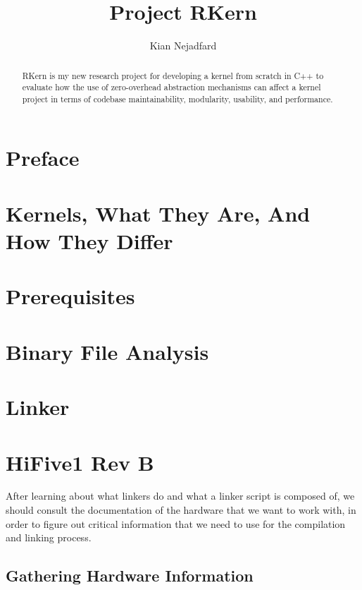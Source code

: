 \documentclass[a4paper,12pt,twoside]{report}
\title{Project RKern}
\author{Kian Nejadfard}
\begin{document}
    \maketitle

    \begin{abstract}
    	RKern is my new research project for developing a kernel from scratch in C++ to evaluate how the use of zero-overhead abstraction mechanisms can affect a kernel project in terms of codebase maintainability, modularity, usability, and performance.
    \end{abstract}

	\chapter{Preface}
        

    \chapter{Kernels, What They Are, And How They Differ}
        

    \chapter{Prerequisites}
        

    \chapter{Binary File Analysis}
        

    \chapter{Linker}
        

    \chapter{HiFive1 Rev B}
        After learning about what linkers do and what a linker script is composed of, we should consult the documentation of the hardware that we want to work with, in order to figure out critical information that we need to use for the compilation and linking process.

        \section{Gathering Hardware Information}
            
\end{document}
